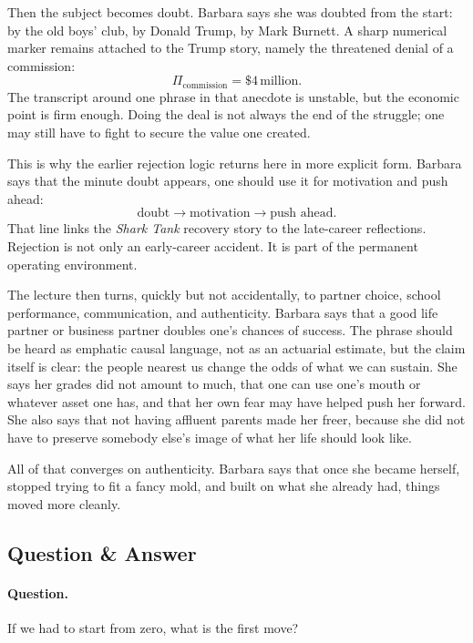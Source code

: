 Then the subject becomes doubt. Barbara says she was doubted from the start: by the old boys' club, by Donald Trump, by Mark Burnett. A sharp numerical marker remains attached to the Trump story, namely the threatened denial of a commission:
\begin{equation}
\Pi_{\text{commission}}=\$4\,\text{million}.
\end{equation}
The transcript around one phrase in that anecdote is unstable, but the economic point is firm enough. Doing the deal is not always the end of the struggle; one may still have to fight to secure the value one created.

This is why the earlier rejection logic returns here in more explicit form. Barbara says that the minute doubt appears, one should use it for motivation and push ahead:
\begin{equation}
\text{doubt}\longrightarrow \text{motivation}\longrightarrow \text{push ahead}.
\end{equation}
That line links the \emph{Shark Tank} recovery story to the late-career reflections. Rejection is not only an early-career accident. It is part of the permanent operating environment.

The lecture then turns, quickly but not accidentally, to partner choice, school performance, communication, and authenticity. Barbara says that a good life partner or business partner doubles one's chances of success. The phrase should be heard as emphatic causal language, not as an actuarial estimate, but the claim itself is clear: the people nearest us change the odds of what we can sustain. She says her grades did not amount to much, that one can use one's mouth or whatever asset one has, and that her own fear may have helped push her forward. She also says that not having affluent parents made her freer, because she did not have to preserve somebody else's image of what her life should look like.

All of that converges on authenticity. Barbara says that once she became herself, stopped trying to fit a fancy mold, and built on what she already had, things moved more cleanly.

\subsection{Question \& Answer}

\paragraph{Question.} If we had to start from zero, what is the first move?

